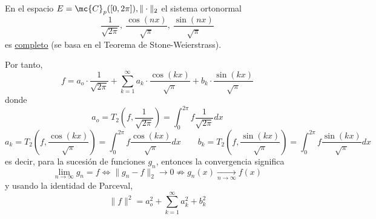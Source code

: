     \begin{teo}
        En el espacio $E=\mc{C}_p([0,2\pi]), \|\cdot\|_2$ el sistema ortonormal
        $$\dfrac{1}{\sqrt{2\pi}},\: \dfrac{\cos(nx)}{\sqrt{\pi}},\: \dfrac{\sin(nx)}{\sqrt{\pi}} $$
        es \underline{completo} (se basa en el Teorema de Stone-Weierstrass). 

        Por tanto,
        $$f=a_o \cdot \dfrac{1}{\sqrt{2\pi}}+ \sum_{k=1}^{\infty} a_k \cdot \dfrac{\cos(kx)}{\sqrt{\pi}} + b_k \cdot \dfrac{\sin(kx)}{\sqrt{\pi}}$$
        donde
        $$a_o=T_2\left(f,\dfrac{1}{\sqrt{2\pi}}\right)=\int_0^{2 \pi} f \dfrac{1}{\sqrt{2\pi}} dx$$
        $$a_k=T_2\left(f,\dfrac{\cos(kx)}{\sqrt{\pi}}\right)=\int_0^{2 \pi} f \dfrac{\cos(kx)}{\sqrt{\pi}} dx \qquad b_k=T_2\left(f,\dfrac{\sin(kx)}{\sqrt{\pi}}\right)=\int_0^{2 \pi} f \dfrac{\sin(kx)}{\sqrt{\pi}} dx$$
        es decir, para la sucesión de funciones $g_n$, entonces la convergencia significa
        $$\lim_{n \to \infty} g_n = f \iff \|g_n-f\|_2 \longrightarrow 0 \not\Longrightarrow g_n(x) \underset{n\to \infty}{\longrightarrow} f(x)$$
        y usando la identidad de Parceval,
        $$\|f\|^2=a_o^2+\sum_{k=1}^{\infty} a_k^2+b_k^2$$
    \end{teo}
